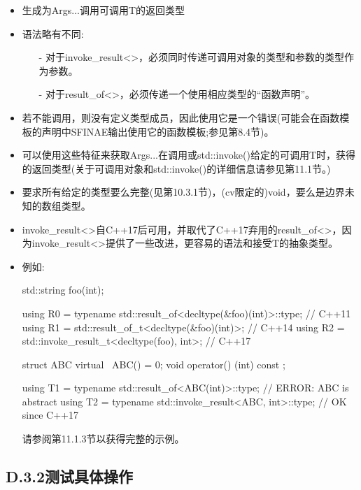 \begin{itemize}
\item 
生成为Args...调用可调用T的返回类型

\item 
语法略有不同:

\begin{itemize}
\item [-]
对于invoke\_result<>，必须同时传递可调用对象的类型和参数的类型作为参数。

\item [-]
对于result\_of<>，必须传递一个使用相应类型的“函数声明”。
\end{itemize}

\item 
若不能调用，则没有定义类型成员，因此使用它是一个错误(可能会在函数模板的声明中SFINAE输出使用它的函数模板;参见第8.4节)。

\item 
可以使用这些特征来获取Args...在调用或std::invoke()给定的可调用T时，获得的返回类型(关于可调用对象和std::invoke()的详细信息请参见第11.1节。)

\item 
要求所有给定的类型要么完整(见第10.3.1节)，(cv限定的)void，要么是边界未知的数组类型。

\item 
invoke\_result<>自C++17后可用，并取代了C++17弃用的result\_of<>，因为invoke\_result<>提供了一些改进，更容易的语法和接受T的抽象类型。

\item 
例如:
\begin{cpp}
std::string foo(int);

using R0 = typename std::result_of<decltype(&foo)(int)>::type; // C++11
using R1 = std::result_of_t<decltype(&foo)(int)>; // C++14
using R2 = std::invoke_result_t<decltype(foo), int>; // C++17

struct ABC {
	virtual ~ABC() = 0;
	void operator() (int) const {
	}
};

using T1 = typename std::result_of<ABC(int)>::type; // ERROR: ABC is abstract
using T2 = typename std::invoke_result<ABC, int>::type; // OK since C++17
\end{cpp}

请参阅第11.1.3节以获得完整的示例。

\end{itemize}

\newpage

\subsection{D.3.2\hspace{0.2cm}测试具体操作}

